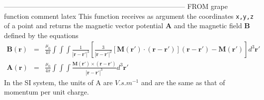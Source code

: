 ------------------------------------------------------------------------------
FROM grape function comment latex
This function receives as argument the coordinates {\tt x,y,z} of a point and 
returns the magnetic vector potential ${\bm A}$ and the magnetic field ${\bm B}$
defined by the equations
\begin{eqnarray}
{\bm B}({\bm r}) &=& \frac{\mu_0}{4\pi} \int\int\int \frac{1}{|{\bm r}-{\bm r}'|^3}
\left[
\frac{3}{|{\bm r}-{\bm r}'|^2} [{\bm M}({\bm r}')\cdot({\bm r}-{\bm r}')]({\bm r}-{\bm r}') - {\bm M}({\bm r}')
\right]
d^3{\bm r}' \\
{\bm A}({\bm r}) &=& 
\frac{\mu_0}{4\pi} \int\int\int \frac{{\bm M}({\bm r}') \times ({\bm r}-{\bm r}')}{|{\bm r}-{\bm r}'|^3}
d^3{\bm r}'
\end{eqnarray}
In the SI system, the units of A are $V.s.m^{-1}$ 
and are the same as that of momentum per unit charge.

